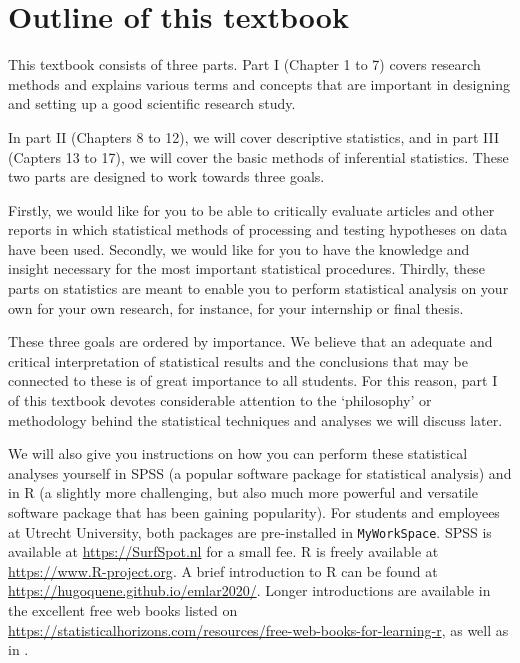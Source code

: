 \documentclass[
]{book}
\begin{document}
\hypertarget{outline-of-this-textbook}{%
\section{Outline of this textbook}\label{outline-of-this-textbook}}

This textbook consists of three parts. Part I (Chapter 1 to 7) covers research methods and explains various terms and concepts that are important in designing and setting up a good scientific research study.

In part II (Chapters 8 to 12), we will cover descriptive statistics, and in part III (Capters 13 to 17), we will cover the basic methods of inferential statistics. These two parts are designed to work towards three goals.

Firstly, we would like for you to be able to critically evaluate articles and other reports in which statistical methods of processing and testing hypotheses on data have been used.
Secondly, we would like for you to have the knowledge and insight necessary for the most important statistical procedures. Thirdly, these parts on statistics are meant to enable you to perform statistical analysis on your own for your own research, for instance, for your internship or final thesis.

These three goals are ordered by importance. We believe that an adequate and critical interpretation of statistical results and the conclusions that may be connected to these is of great importance to all students. For this reason, part I of this textbook devotes considerable attention to the `philosophy' or methodology behind the statistical techniques and analyses we will discuss later.

We will also give you instructions on how you can perform these statistical analyses yourself in SPSS (a popular software package for statistical analysis) and in R (a slightly more challenging, but also much more powerful and versatile software package that has been gaining popularity).
For students and employees at Utrecht University, both packages are pre-installed in \texttt{MyWorkSpace}. SPSS is available at \url{https://SurfSpot.nl} for a small fee.
R is freely available at \url{https://www.R-project.org}.
A brief introduction to R can be found at \url{https://hugoquene.github.io/emlar2020/}.
Longer introductions are available in the excellent free web books listed on \url{https://statisticalhorizons.com/resources/free-web-books-for-learning-r}, as well as in \citet{Dalg02}.
\end{document}
